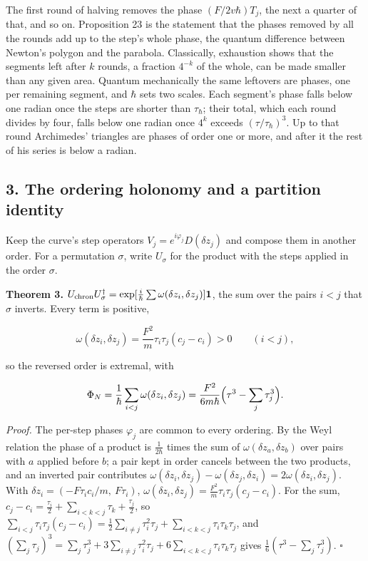 \documentclass[11pt,a4paper]{article}
\begin{document}
The first round of halving removes the phase \((F/2v\hbar)T_j\), the
next a quarter of that, and so on. Proposition 23 is the statement that
the phases removed by all the rounds add up to the step's whole phase,
the quantum difference between Newton's polygon and the parabola.
Classically, exhaustion shows that the segments left after \(k\) rounds,
a fraction \(4^{-k}\) of the whole, can be made smaller than any given
area. Quantum mechanically the same leftovers are phases, one per
remaining segment, and \(\hbar\) sets two scales. Each segment's phase
falls below one radian once the steps are shorter than \(\tau_\hbar\);
their total, which each round divides by four, falls below one radian
once \(4^k\) exceeds \((\tau/\tau_\hbar)^3\). Up to that round
Archimedes' triangles are phases of order one or more, and after it the
rest of his series is below a radian.

\hypertarget{the-ordering-holonomy-and-a-partition-identity}{%
\subsection{3. The ordering holonomy and a partition
identity}\label{the-ordering-holonomy-and-a-partition-identity}}

Keep the curve's step operators \(V_j=e^{i\varphi_j}D(\delta z_j)\) and
compose them in another order. For a permutation \(\sigma\), write
\(U_\sigma\) for the product with the steps applied in the order
\(\sigma\).

\textbf{Theorem 3.}
\(U_{\rm chron}U_\sigma^\dagger=\exp[\frac{i}{\hbar}\sum\omega(\delta z_i,\delta z_j)]\mathbf 1\),
the sum over the pairs \(i<j\) that \(\sigma\) inverts. Every term is
positive,

\[\omega(\delta z_i,\delta z_j)=\frac{F^2}{m}\tau_i\tau_j(c_j-c_i)>0\qquad(i<j),\]

so the reversed order is extremal, with

\[\Phi_N=\frac1\hbar\sum_{i<j}\omega(\delta z_i,\delta z_j)
=\frac{F^2}{6m\hbar}\Bigl(\tau^3-\sum_j\tau_j^3\Bigr).\]

\emph{Proof.} The per-step phases \(\varphi_j\) are common to every
ordering. By the Weyl relation the phase of a product is
\(\frac1{2\hbar}\) times the sum of \(\omega(\delta z_a,\delta z_b)\)
over pairs with \(a\) applied before \(b\); a pair kept in order cancels
between the two products, and an inverted pair contributes
\(\omega(\delta z_i,\delta z_j)-\omega(\delta z_j,\delta z_i)=2\omega(\delta z_i,\delta z_j)\).
With \(\delta z_i=(-F\tau_ic_i/m,\ F\tau_i)\),
\(\omega(\delta z_i,\delta z_j)=\frac{F^2}{m}\tau_i\tau_j(c_j-c_i)\).
For the sum,
\(c_j-c_i=\frac{\tau_i}2+\sum_{i<k<j}\tau_k+\frac{\tau_j}2\), so
\(\sum_{i<j}\tau_i\tau_j(c_j-c_i)=\frac12\sum_{i\ne j}\tau_i^2\tau_j+\sum_{i<k<j}\tau_i\tau_k\tau_j\),
and
\((\sum_j\tau_j)^3=\sum_j\tau_j^3+3\sum_{i\ne j}\tau_i^2\tau_j+6\sum_{i<k<j}\tau_i\tau_k\tau_j\)
gives \(\frac16(\tau^3-\sum_j\tau_j^3)\). \(\square\)
\end{document}
